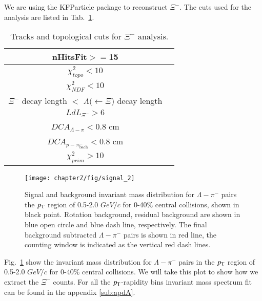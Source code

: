 We are using the KFParticle package to reconstruct $\Xi^{-}$. The cuts used for the analysis are listed in Tab.~\ref{tab:kfptcxicuts}. 

\begin{table*}
\caption{Tracks and topological cuts for $\Xi^{-}$ analysis.}
\label{tab:kfptcxicuts}
\begin{tabular}{|c|c|}
\hline
nHitsFit$>=$15 \\ \hline
$\chi^{2}_{topo}<10$ \\ \hline
$\chi^{2}_{NDF}<10$ \\ \hline
$\Xi^{-}$ decay length $<$ $\Lambda(\leftarrow\Xi$) decay length \\ \hline
$LdL_{\Xi^-}>6$ \\ \hline
$DCA_{\Lambda-\pi}<0.8$ cm\\ \hline
$DCA_{p-\pi^{-}_{\text{bach}}}<0.8$ cm\\ \hline
$\chi^{2}_{prim}>10$ \\ \hline 
\end{tabular}
\end{table*}


\begin{figure*}[hbt!]
\texttt{[image: chapterZ/fig/signal\_2]}
\caption{Signal and background invariant mass distribution for $\Lambda-\pi^{-}$ pairs the $p_{\rm T}$ region of 0.5-2.0 $GeV/c$ for 0-40\% central collisions, shown in black point. Rotation background, residual background are shown in blue open circle and blue dash line, respectively. The final background subtracted $\Lambda-\pi^{-}$ pairs is shown in red line, the counting window is indicated as the vertical red dash lines.}
\label{xi_signal}
\end{figure*}

Fig.~\ref{xi_signal} show the invariant mass distribution for $\Lambda-\pi^{-}$ pairs in the $p_{\rm T}$ region of 0.5-2.0 $GeV/c$ for 0-40\% central collisions. We will take this plot to show how we extract the $\Xi^{-}$ counts. For all the $p_{\rm T}$-rapidity bins invariant mass spectrum fit can be found in the appendix \ref{sub:apdA}. 


